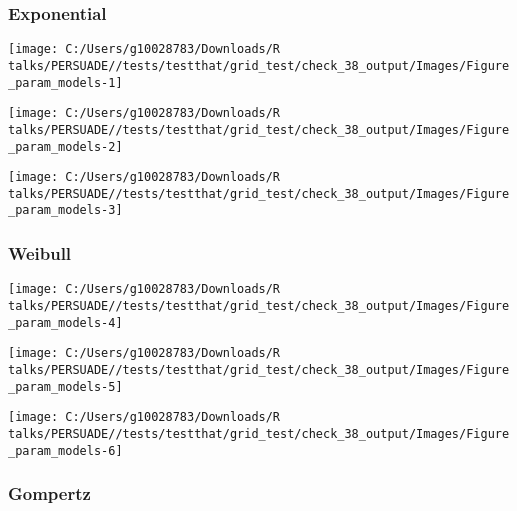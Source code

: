 \documentclass[
]{article}
\begin{document}
\clearpage

\clearpage

\subsubsection{Exponential}\label{exponential}

\begin{flushleft}\texttt{[image: C:/Users/g10028783/Downloads/R talks/PERSUADE//tests/testthat/grid\_test/check\_38\_output/Images/Figure\_param\_models-1]} \end{flushleft}

\begin{flushleft}\texttt{[image: C:/Users/g10028783/Downloads/R talks/PERSUADE//tests/testthat/grid\_test/check\_38\_output/Images/Figure\_param\_models-2]} \end{flushleft}

\begin{flushleft}\texttt{[image: C:/Users/g10028783/Downloads/R talks/PERSUADE//tests/testthat/grid\_test/check\_38\_output/Images/Figure\_param\_models-3]} \end{flushleft}

\clearpage

\subsubsection{Weibull}\label{weibull}

\begin{flushleft}\texttt{[image: C:/Users/g10028783/Downloads/R talks/PERSUADE//tests/testthat/grid\_test/check\_38\_output/Images/Figure\_param\_models-4]} \end{flushleft}

\begin{flushleft}\texttt{[image: C:/Users/g10028783/Downloads/R talks/PERSUADE//tests/testthat/grid\_test/check\_38\_output/Images/Figure\_param\_models-5]} \end{flushleft}

\begin{flushleft}\texttt{[image: C:/Users/g10028783/Downloads/R talks/PERSUADE//tests/testthat/grid\_test/check\_38\_output/Images/Figure\_param\_models-6]} \end{flushleft}

\clearpage

\subsubsection{Gompertz}\label{gompertz}
\end{document}

